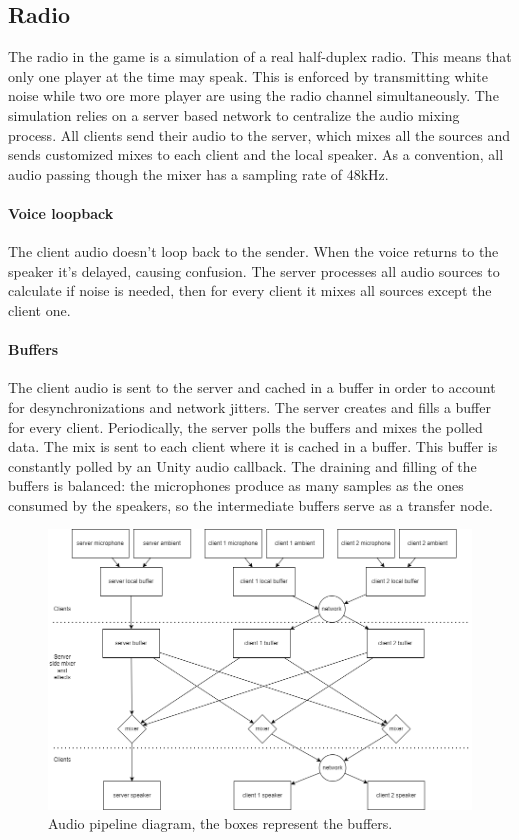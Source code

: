\documentclass[12pt]{article}
\begin{document}
\clearpage

\subsection{Radio}
The radio in the game is a simulation of a real half-duplex radio. This means that only one player at the time may speak. This is enforced by transmitting white noise while two ore more player are using the radio channel simultaneously. The simulation relies on a server based network to centralize the audio mixing process. All clients send their audio to the server, which mixes all the sources and sends customized mixes to each client and the local speaker. As a convention, all audio passing though the mixer has a sampling rate of 48kHz. 
\paragraph{Voice loopback}
The client audio doesn't loop back to the sender. When the voice returns to the speaker it's delayed, causing confusion. The server processes all audio sources to calculate if noise is needed, then for every client it mixes all sources except the client one.
\paragraph{Buffers}
The client audio is sent to the server and cached in a buffer in order to account for desynchronizations and network jitters. The server creates and fills a buffer for every client. Periodically, the server polls the buffers and mixes the polled data. The mix is sent to each client where it is cached in a buffer. This buffer is constantly polled by an Unity audio callback. The draining and filling of the buffers is balanced: the microphones produce as many samples as the ones consumed by the speakers, so the intermediate buffers serve as a transfer node. 

\begin{figure}[H]
\includegraphics[width=\textwidth]{audio_mixer}
\caption{Audio pipeline diagram, the boxes represent the buffers.}
\end{figure}
\end{document}
